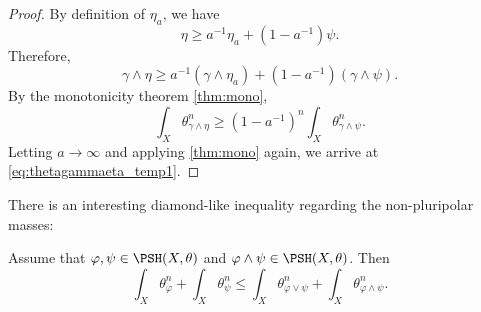 \begin{proof}
    By definition of $\eta_a$, we have
    \[
    \eta\geq a^{-1}\eta_a+\left(1-a^{-1}\right)\psi.
    \]
    Therefore,
    \[
    \gamma\land \eta\geq a^{-1} (\gamma\land \eta_a)+\left(1-a^{-1}\right) \left( \gamma\land\psi \right).
    \]
    By the monotonicity theorem \cref{thm:mono},
    \[
    \int_X \theta_{\gamma\land \eta}^n\geq \left(1-a^{-1}\right)^n\int_X \theta_{\gamma\land \psi}^n.
    \]
    Letting $a\to \infty$ and applying \cref{thm:mono} again, we arrive at \eqref{eq:thetagammaeta_temp1}.
\end{proof}

There is an interesting diamond-like inequality regarding the non-pluripolar masses:
\begin{theorem}\label{thm:diamond}
    Assume that $\varphi,\psi\in \PSH(X,\theta)$ and $\varphi\land \psi\in \PSH(X,\theta)$. Then
    \begin{equation}\label{eq:diamond}
        \int_X \theta_{\varphi}^n+\int_X \theta_{\psi}^n\leq \int_X \theta_{\varphi\lor \psi}^n+\int_X \theta_{\varphi\land \psi}^n.
    \end{equation}
\end{theorem}
